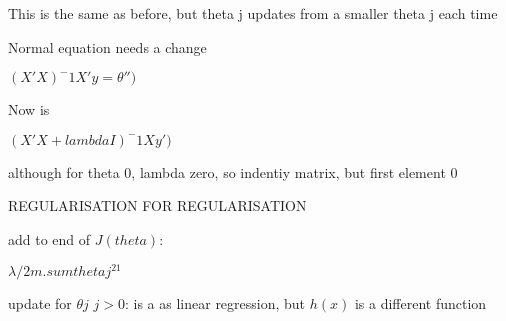 This is the same as before, but theta j updates from a smaller theta j each time

Normal equation needs a change

\((X'X)^-1X'y=\theta'')\)

Now is

\((X'X+lambdaI)^-1X y  ')\)

although for theta 0, lambda zero, so indentiy matrix, but first element 0

REGULARISATION FOR REGULARISATION

add to end of \(J(theta)\):

\(\lambda/2m .sum thetaj^21\)

update for \(\theta \)\(j\) \(j>0\):
is a as linear regression, but \(h(x)\) is a different function

